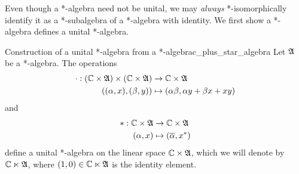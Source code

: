 Even though a *-algebra need not be unital, we may \emph{always} *-isomorphically identify it as a *-subalgebra of a *-algebra with identity. We first show a *-algebra defines a unital *-algebra.
\begin{proposition}{Construction of a unital *-algebra from a *-algebra}{c_plus_star_algebra}
    Let \(\mathfrak{A}\) be a *-algebra. The operations
    \begin{align*}
        \cdot : \left(\mathbb{C}\times\mathfrak{A}\right) \times \left(\mathbb{C} \times \mathfrak{A}\right) &\to \mathbb{C} \times \mathfrak{A}\\
        \left((\alpha, x),(\beta,y)\right)&\mapsto (\alpha\beta, \alpha y + \beta x + xy)
    \end{align*}
    and
    \begin{align*}
        * : \mathbb{C} \times \mathfrak{A} &\to \mathbb{C}\times\mathfrak{A}\\
        (\alpha, x)&\mapsto (\overline{\alpha}, x^*)
    \end{align*}
    define a unital *-algebra on the linear space \(\mathbb{C} \times \mathfrak{A}\), which we will denote by \(\mathbb{C} \ltimes \mathfrak{A}\), where \((1, 0) \in \mathbb{C} \ltimes \mathfrak{A}\) is the identity element.
\end{proposition}

